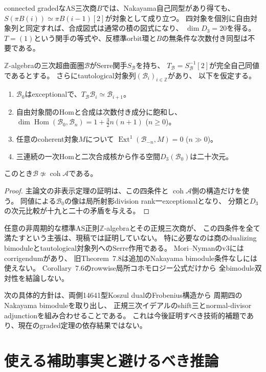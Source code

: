 \documentclass[11pt,a4paper]{ltjsarticle}
\begin{document}
connected gradedなAS三次商$B$では、Nakayama自己同型があり得ても、
$S(\pi B(i))\simeq\pi B(i-1)[2]$が対象として成り立つ。
四対象を個別に自由対象列と同定すれば、合成図式は通常の積の図式になり、
$\dim D_3=20$を得る。
$T=(1)$という関手の等式や、反標準orbit環と$B$の無条件な次数付き同型は不要である。

\begin{proposition}[追加仮定の下での拡張]\label{prop:conditional-Z}
$\mathbb Z$-algebraの三次超曲面圏$\mathcal B$がSerre関手$S_{\mathcal B}$を持ち、
$T_{\mathcal B}=S_{\mathcal B}^{-1}[2]$が完全自己同値であるとする。
さらにtautological対象列$(\mathcal B_i)_{i\in\mathbb Z}$があり、
以下を仮定する。
\begin{enumerate}
\item $\mathcal B_0$はexceptionalで、$T_{\mathcal B}\mathcal B_i\simeq\mathcal B_{i+1}$。
\item 自由対象間のHomと合成は次数付き成分に飽和し、
$\dim\operatorname{Hom}(\mathcal B_0,\mathcal B_n)=1+\frac32n(n+1)$ ($n\ge0$)。
\item 任意のcoherent対象$M$について
$\operatorname{Ext}^1(\mathcal B_{-n},M)=0$ ($n\gg0$)。
\item 三連続の一次Homと二次合成核から作る空間$D_3(\mathcal B_0)$は二十次元。
\end{enumerate}
このとき$\mathcal B\not\simeq\operatorname{coh}\mathcal A$である。
\end{proposition}
\begin{proof}
主論文の非表示定理の証明は、この四条件と
$\operatorname{coh}\mathcal A$側の構造だけを使う。
同値による$\mathcal B_0$の像は局所射影division rank一exceptionalとなり、
分類と$D_3$の次元比較が十九と二十の矛盾を与える。
\end{proof}

任意の非周期的な標準AS正則$\mathbb Z$-algebraとその正規三次商が、
この四条件を全て満たすという主張は、現稿では証明していない。
特に必要なのは商のdualizing bimoduleとtautological対象列へのSerre作用である。
Mori--Nyman\cite{MoriNyman}のv3にはcorrigendumがあり、
旧Theorem~7.8は追加のNakayama bimodule条件なしには使えない。
Corollary~7.6のrowwise局所コホモロジー公式だけから
全bimodule双対性を結論しない。

次の具体的方針は、両側14641型Koszul dualのFrobenius構造から
周期四のNakayama bimoduleを取り出し、
正規三次イデアルのshift三とnormal-divisor adjunctionを組み合わせることである。
これは今後証明すべき技術的補題であり、現在のgraded定理の依存結果ではない。

\section{使える補助事実と避けるべき推論}
\end{document}
